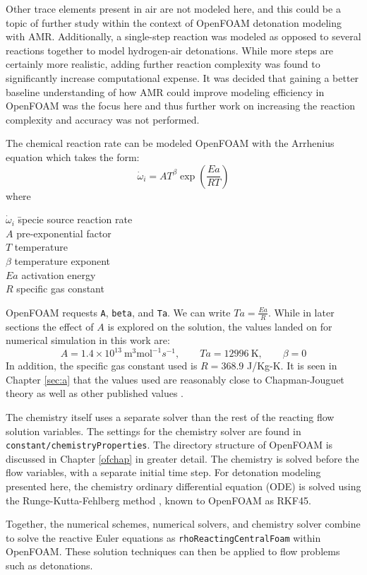 Other trace elements present in air are not modeled here, and this could be a topic of further study within the context of OpenFOAM detonation modeling with AMR. Additionally, a single-step reaction was modeled as opposed to several reactions together to model hydrogen-air detonations. While more steps are certainly more realistic, adding further reaction complexity was found to significantly increase computational expense. It was decided that gaining a better baseline understanding of how AMR could improve modeling efficiency in OpenFOAM was the focus here and thus further work on increasing the reaction complexity and accuracy was not performed. 

The chemical reaction rate can be modeled OpenFOAM with the Arrhenius equation \cite{christ} which takes the form: 
\begin{equation}
\dot{\omega}_i = AT^\beta \exp\left(\frac{Ea}{R T}\right)
\end{equation}
where 
\begin{tabbing}
\qquad \= \(\dot{\omega}_i\) \qquad \= specie source reaction rate \\ 
\> \(A\) \> pre-exponential factor \\
\> \(T\) \> temperature \\
\> \(\beta\) \> temperature exponent \\
\> \(Ea\) \> activation energy \\
\> \(R\) \> specific gas constant 
\end{tabbing}

\noindent OpenFOAM requests \verb|A|, \verb|beta|, and \verb|Ta|. We can write \(Ta = \frac{Ea}{R }\). While in later sections the effect of \(A\) is explored on the solution, the values landed on for numerical simulation in this work are:
\begin{equation}
   A = 1.4 \times 10^{13} ~ \text{m}^3\text{mol}^{-1}s^{-1},
   \qquad 
   Ta = 12996 ~\text{K},
   \qquad
   \beta = 0
\end{equation}
\noindent In addition, the specific gas constant used is \(R = 368.9\) J/Kg-K. It is seen in Chapter \ref{sec:a} that the values used are reasonably close to Chapman-Jouguet theory as well as other published values \cite{towery1}\cite{hashemi}. 

The chemistry itself uses a separate solver than the rest of the reacting flow solution variables. The settings for the chemistry solver are found in \verb|constant/chemistryProperties|. The directory structure of OpenFOAM is discussed in Chapter \ref{ofchap} in greater detail. The chemistry is solved before the flow variables, with a separate initial time step. For detonation modeling presented here, the chemistry ordinary differential equation (ODE) is solved using the Runge-Kutta-Fehlberg method \cite{rkf}, known to OpenFOAM as RKF45. 

Together, the numerical schemes, numerical solvers, and chemistry solver combine to solve the reactive Euler equations as \verb|rhoReactingCentralFoam| within OpenFOAM. These solution techniques can then be applied to flow problems such as detonations. 

